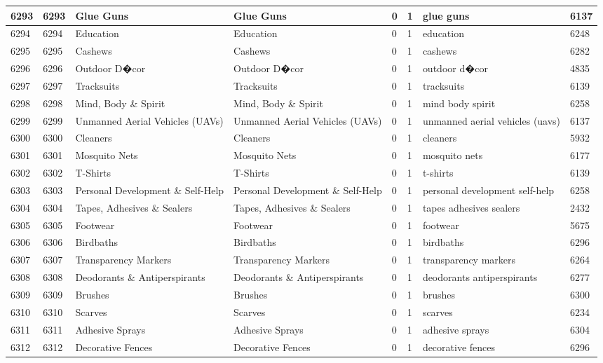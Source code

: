 \begin{longtable}{|l|l|l|l|l|l|l|l|}
6293 & 6293 & Glue Guns & Glue Guns & 0 & 1 & glue guns & 6137 \\ \hline 
6294 & 6294 & Education & Education & 0 & 1 & education & 6248 \\ \hline 
6295 & 6295 & Cashews & Cashews & 0 & 1 & cashews & 6282 \\ \hline 
6296 & 6296 & Outdoor D�cor & Outdoor D�cor & 0 & 1 & outdoor d�cor & 4835 \\ \hline 
6297 & 6297 & Tracksuits & Tracksuits & 0 & 1 & tracksuits & 6139 \\ \hline 
6298 & 6298 & Mind, Body \& Spirit & Mind, Body \& Spirit & 0 & 1 & mind body spirit & 6258 \\ \hline 
6299 & 6299 & Unmanned Aerial Vehicles (UAVs) & Unmanned Aerial Vehicles (UAVs) & 0 & 1 & unmanned aerial vehicles (uavs) & 6137 \\ \hline 
6300 & 6300 & Cleaners & Cleaners & 0 & 1 & cleaners & 5932 \\ \hline 
6301 & 6301 & Mosquito Nets & Mosquito Nets & 0 & 1 & mosquito nets & 6177 \\ \hline 
6302 & 6302 & T-Shirts & T-Shirts & 0 & 1 & t-shirts & 6139 \\ \hline 
6303 & 6303 & Personal Development \& Self-Help & Personal Development \& Self-Help & 0 & 1 & personal development self-help & 6258 \\ \hline 
6304 & 6304 & Tapes, Adhesives \& Sealers & Tapes, Adhesives \& Sealers & 0 & 1 & tapes adhesives sealers & 2432 \\ \hline 
6305 & 6305 & Footwear & Footwear & 0 & 1 & footwear & 5675 \\ \hline 
6306 & 6306 & Birdbaths & Birdbaths & 0 & 1 & birdbaths & 6296 \\ \hline 
6307 & 6307 & Transparency Markers & Transparency Markers & 0 & 1 & transparency markers & 6264 \\ \hline 
6308 & 6308 & Deodorants \& Antiperspirants & Deodorants \& Antiperspirants & 0 & 1 & deodorants antiperspirants & 6277 \\ \hline 
6309 & 6309 & Brushes & Brushes & 0 & 1 & brushes & 6300 \\ \hline 
6310 & 6310 & Scarves & Scarves & 0 & 1 & scarves & 6234 \\ \hline 
6311 & 6311 & Adhesive Sprays & Adhesive Sprays & 0 & 1 & adhesive sprays & 6304 \\ \hline 
6312 & 6312 & Decorative Fences & Decorative Fences & 0 & 1 & decorative fences & 6296 \\ \hline 

\end{longtable}
